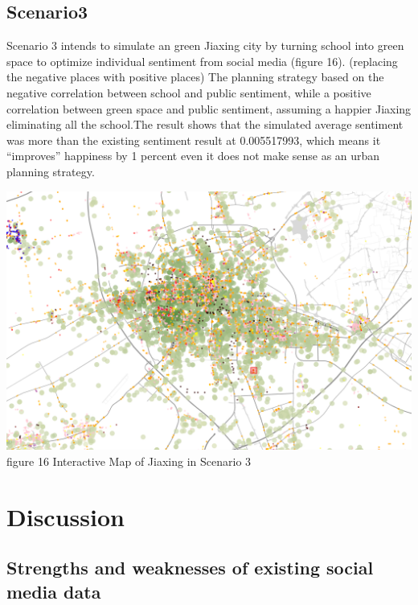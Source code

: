 \documentclass[
]{article}
\begin{document}
\hypertarget{scenario3}{%
\subsection{Scenario3}\label{scenario3}}

Scenario 3 intends to simulate an green Jiaxing city by turning school
into green space to optimize individual sentiment from social media
(figure 16). (replacing the negative places with positive places) The
planning strategy based on the negative correlation between school and
public sentiment, while a positive correlation between green space and
public sentiment, assuming a happier Jiaxing eliminating all the
school.The result shows that the simulated average sentiment was more
than the existing sentiment result at 0.005517993, which means it
``improves'' happiness by 1 percent even it does not make sense as an
urban planning strategy.

\href{https://WTHSYZW.github.io/Thesis_2022/jx_map_scenario3.html}{\includegraphics{maps/jx_map_scenario3.png}}
figure 16 Interactive Map of Jiaxing in Scenario 3

\hypertarget{discussion}{%
\section{Discussion}\label{discussion}}

\hypertarget{strengths-and-weaknesses-of-existing-social-media-data}{%
\subsection{Strengths and weaknesses of existing social media
data}\label{strengths-and-weaknesses-of-existing-social-media-data}}
\end{document}
